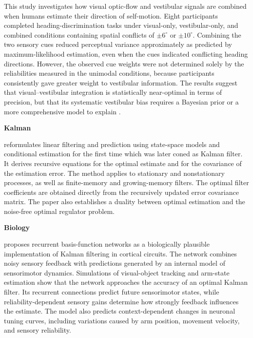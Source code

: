 \documentclass{book}
\providecommand{\ProjectDeepHeading}[2]{%
    \par\medskip\noindent\textbf{#2}\par\smallskip
}
\begin{document}
This study investigates how visual optic-flow and vestibular signals are combined when humans estimate their direction of self-motion. Eight participants completed heading-discrimination tasks under visual-only, vestibular-only, and combined conditions containing spatial conflicts of $\pm 6^{\circ}$ or $\pm 10^{\circ}$.
    Combining the two sensory cues reduced perceptual variance approximately as predicted by maximum-likelihood estimation, even when the cues indicated conflicting heading directions. However, the observed cue weights were not determined solely by the reliabilities measured in the unimodal conditions, because participants consistently gave greater weight to vestibular information. The results suggest that visual--vestibular integration is statistically near-optimal in terms of precision, but that its systematic vestibular bias requires a Bayesian prior or a more comprehensive model to explain \cite{butler-2010-bayesian-integration-of-visual-and-vestibular-signals-for-heading}.

\ProjectDeepHeading{6}{Kalman}


\cite{kalman-1960-a-new-approach-to-linear-filtering-and-prediction-problems} reformulates linear filtering and prediction using state-space models and conditional estimation for the first time which was later coned as Kalman filter.
    It derives recursive equations for the optimal estimate and for the covariance of the estimation error.
    The method applies to stationary and nonstationary processes, as well as finite-memory and growing-memory filters.
    The optimal filter coefficients are obtained directly from the recursively updated error covariance matrix.
    The paper also establishes a duality between optimal estimation and the noise-free optimal regulator problem.

\ProjectDeepHeading{7}{Biology}


\cite{deneve-2007-optimal-sensorimotor-integration-in-recurrent-cortical-networks-a-neural-implementation-of-kalman-filters} proposes recurrent basis-function networks as a biologically plausible implementation of Kalman filtering in cortical circuits.
    The network combines noisy sensory feedback with predictions generated by an internal model of sensorimotor dynamics.
    Simulations of visual-object tracking and arm-state estimation show that the network approaches the accuracy of an optimal Kalman filter.
    Its recurrent connections predict future sensorimotor states, while reliability-dependent sensory gains determine how strongly feedback influences the estimate.
    The model also predicts context-dependent changes in neuronal tuning curves, including variations caused by arm position, movement velocity, and sensory reliability.
\end{document}
